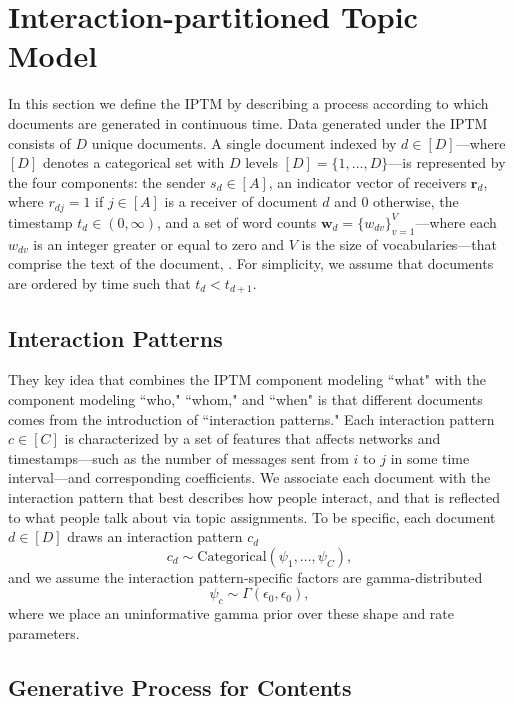 \documentclass[ba]{imsart}
\numberwithin{equation}{section}
\theoremstyle{plain}
\begin{document}
	\section{Interaction-partitioned Topic Model}\label{sec:generative process}
		In this section we define the IPTM by describing a process according to which documents are generated in continuous time. Data generated under the IPTM consists of $D$ unique documents. A single document indexed by $d \in [D]$---where $[D]$ denotes a categorical set with $D$ levels $[D] = \{1,\ldots,D\}$---is represented by the four components: the sender $s_d \in [A]$, an indicator vector of receivers $\boldsymbol{r}_d$, where $r_{dj}=1$ if $j \in [A]$ is a receiver of document $d$ and 0 otherwise, the timestamp $t_d \in (0, \infty)$, and a set of word counts $\boldsymbol{w}_d= \{w_{dv} \}_{v=1}^{V}$---where each $w_{dv}$ is an integer greater or equal to zero and $V$ is the size of vocabularies---that comprise the text of the document, . For simplicity, we assume that documents are ordered by time such that $t_d < t_{d+1}$.~
		
\subsection{Interaction Patterns}\label{subsec:Interaction patterns}
They key idea that combines the IPTM component modeling ``what" with
the component modeling ``who," ``whom," and ``when" is that different
documents comes from the introduction of ``interaction patterns."  Each interaction pattern $c \in [C]$ is characterized by a set of features that affects networks and timestamps---such as the number of messages sent from $i$ to $j$ in some time interval---and corresponding coefficients. We associate each document with the interaction pattern that best describes how people interact, and that is reflected to what people talk about via topic assignments. To be specific, each document $d \in [D]$ draws an interaction pattern $c_d$
\begin{equation}
c_d\sim \mbox{Categorical}({\psi_1},\ldots,{\psi_C}),
\end{equation}
and we assume the interaction pattern-specific factors are gamma-distributed
\begin{equation}
\psi_c\sim \Gamma(\epsilon_0,\epsilon_0),
\end{equation}
where we place an uninformative gamma prior over these shape and rate parameters.~

\subsection{Generative Process for Contents}\label{subsec:Content generating process}
\end{document}
